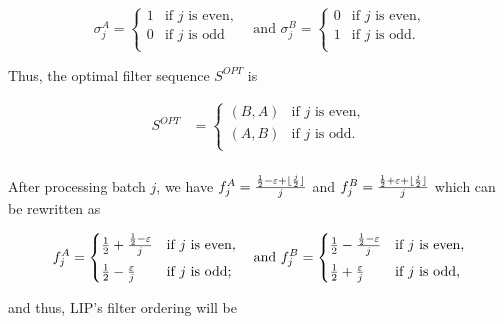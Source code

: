 \begin{equation*}
\sigma_j^A = 
    \begin{cases}
    1 & \text{if $j$ is even,} \\[0.5em]
    0 & \text{if $j$ is odd} \\
    \end{cases} \quad \text{and }
\sigma_j^B = 
    \begin{cases}
    0 & \text{if $j$ is even,} \\[0.5em]
    1 &  \text{if $j$ is odd}. \\
    \end{cases}
\end{equation*}

Thus, the optimal filter sequence $S^{OPT}$ is 

\begin{align*}
S^{OPT} &= 
    \begin{cases}
    (B, A) & \text{if $j$ is even}, \\[0.5em]
    (A, B) & \text{if $j$ is odd}. \\
    \end{cases}\\[0.5em]
\end{align*}

\DeclarePairedDelimiter\floor{\lfloor}{\rfloor}
After processing batch $j$,  we have $f_j^A = \frac{\frac{1}{2} - \varepsilon + \floor{\frac{j}{2}}}{j}$ and $f_j^B = \frac{\frac{1}{2} + \varepsilon + \floor{\frac{j}{2}}}{j}$  which can be rewritten as

\begin{equation*}
f_j^A = 
    \begin{cases}
    \frac{1}{2} + \frac{\frac{1}{2}-\varepsilon}{j} & \text{if $j$ is even}, \\[0.5em]
    \frac{1}{2} - \frac{\varepsilon}{j} &  \text{if $j$ is odd}; \\
    \end{cases}  \quad \text{and }
f_j^B = 
    \begin{cases}
    \frac{1}{2} - \frac{\frac{1}{2}-\varepsilon}{j} & \text{if $j$ is even}, \\[0.5em]
    \frac{1}{2} + \frac{\varepsilon}{j} &  \text{if $j$ is odd}, \\
    \end{cases}\\[0.5em]
\end{equation*}

and thus, LIP's filter ordering will be

